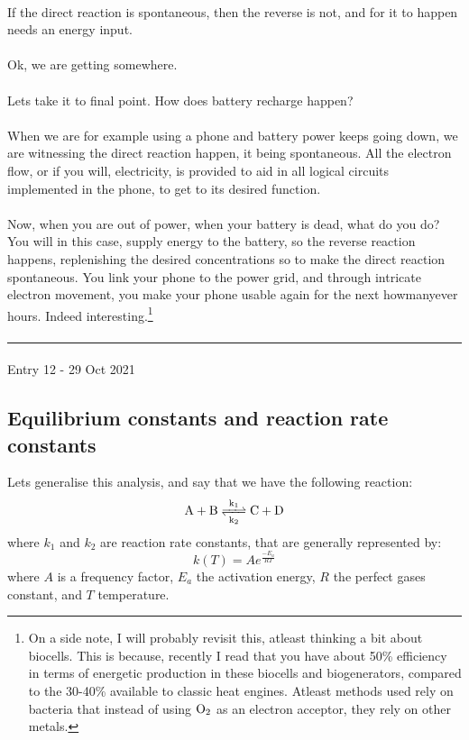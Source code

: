 \documentclass[12pt,  letterpaper]{article}
\begin{document}
\paragraph*{}
If the direct reaction is spontaneous, then the reverse is not, and for it to happen needs an energy input. 
\paragraph*{}
Ok, we are getting somewhere.
\paragraph*{}
Lets take it to final point. How does battery recharge happen?
\paragraph*{}
When we are for example using a phone and battery power keeps going down, we are witnessing the direct reaction happen, it being spontaneous. All the electron flow, or if you will, electricity, is provided to aid in all logical circuits implemented in the phone, to get to its desired function.\paragraph*{}
Now, when you are out of power, when your battery is dead, what do you do? You will in this case, supply energy to the battery, so the reverse reaction happens, replenishing the desired concentrations so to make the direct reaction spontaneous. You link your phone to the power grid, and through intricate electron movement, you make your phone usable again for the next howmanyever hours. Indeed interesting.\footnote{On a side note, I will probably revisit this, atleast thinking a bit about biocells. This is because, recently I read that you have about 50\% efficiency in terms of energetic production in these biocells and biogenerators, compared to the 30-40\% available to classic heat engines. Atleast methods used rely on bacteria that instead of using $\ce{O_{2}}$ as an electron acceptor, they rely on other metals.}
\paragraph*{}
\hrule
\paragraph*{}
Entry 12 - 29 Oct 2021
\subsection*{Equilibrium constants and reaction rate constants}
Lets generalise this analysis, and say that we have the following reaction:
\begin{equation}
\ce{A + B <=>[k_{1}][k_{2}] C + D}
\end{equation}
where $k_{1}$ and $k_{2}$ are reaction rate constants, that are generally represented by:
\begin{equation}
k(T) = Ae^{\frac{-E_{a}}{RT}}
\end{equation}
where $A$ is a frequency factor, $E_{a}$ the activation energy, $R$ the perfect gases constant, and $T$ temperature.
\end{document}
